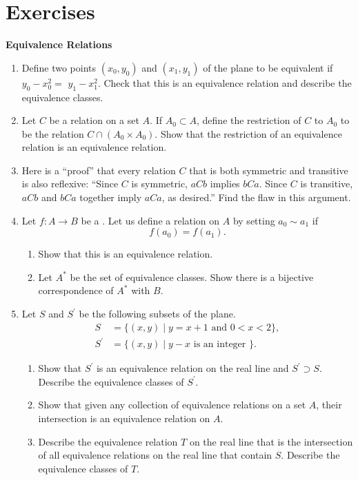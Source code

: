 \section*{Exercises}
\textbf{Equivalence Relations}
\begin{enumerate}[itemsep=0.4em, parsep=0pt, topsep=0pt, partopsep=0pt, leftmargin=*, label=\arabic*., ref=\arabic*]
\item Define two points \(({x_{0},y_{0}})\) and \(({x_{1},y_{1}})\) of the plane to be equivalent if \(y_{0} - x_0^{2} =\) \(y_{1} - x_1^{2}\). Check that this is an equivalence relation and describe the equivalence classes.
\item Let \(C\) be a relation on a set \(A\). If \(A_{0} \subset A\), define the restriction of \(C\) to \(A_{0}\) to be the relation \(C \cap ({A_{0} \times {A}_{0}})\). Show that the restriction of an equivalence relation is an equivalence relation.
\item Here is a ``proof'' that every relation \(C\) that is both symmetric and transitive is also reflexive: ``Since \(C\) is symmetric, \({aCb}\) implies \({bCa}\). Since \(C\) is transitive, \({aCb}\) and \({bCa}\) together imply \({aCa}\), as desired.'' Find the flaw in this argument.
\item Let \(f : A \rightarrow B\) be a . Let us define a relation on \(A\) by setting \(a_{0} \sim {a}_{1}\) if \[ f(a_{0}) = f(a_{1}). \]
  \begin{enumerate}[itemsep=0.2em, parsep=0pt, topsep=0pt, partopsep=0pt, leftmargin=*, label=(\alph*), align=left]
  \item Show that this is an equivalence relation.
  \item Let \(A^{ * }\) be the set of equivalence classes. Show there is a bijective correspondence of \(A^{ * }\) with \(B\).
  \end{enumerate}
\item Let \(S\) and \(S^{\prime }\) be the following subsets of the plane. \[ \begin{aligned} S &= \{ ({x,y}) \mid y = x + 1\text{ and }0 < x < 2\}, \\ S^{\prime } &= \{ ({x,y}) \mid y - x\text{ is an integer }\}. \end{aligned} \]
  \begin{enumerate}[itemsep=0.2em, parsep=0pt, topsep=0pt, partopsep=0pt, leftmargin=*, label=(\alph*), align=left]
  \item Show that \(S^{\prime }\) is an equivalence relation on the real line and \(S^{\prime } \supset S\). Describe the equivalence classes of \(S^{\prime }\).
  \item Show that given any collection of equivalence relations on a set \(A\), their intersection is an equivalence relation on \(A\).
  \item Describe the equivalence relation \(T\) on the real line that is the intersection of all equivalence relations on the real line that contain \(S\). Describe the equivalence classes of \(T\).
  \end{enumerate}
\end{enumerate}

